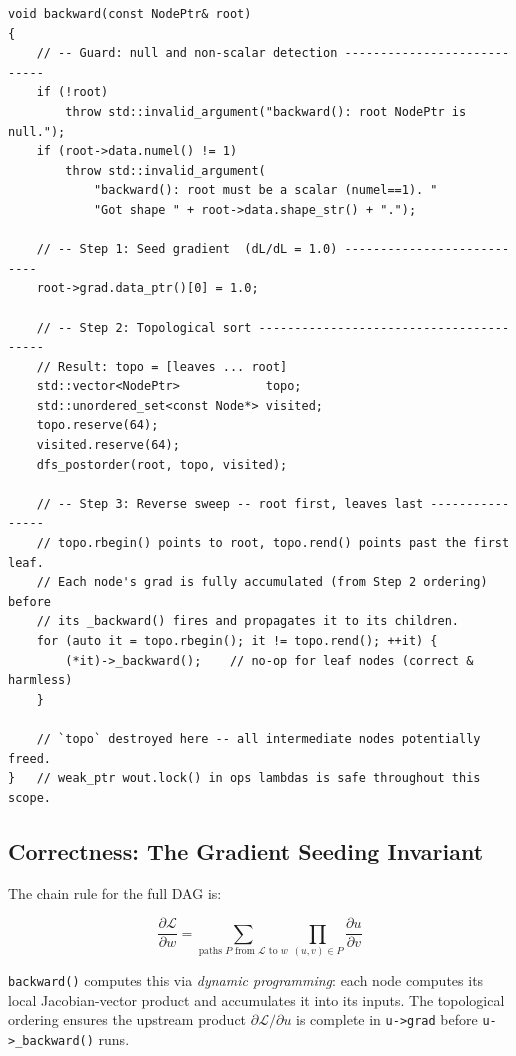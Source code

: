 \documentclass[12pt, a4paper]{article}
\begin{document}
\begin{lstlisting}[caption={\texttt{backward()} - the complete implementation}]
void backward(const NodePtr& root)
{
    // -- Guard: null and non-scalar detection ----------------------------
    if (!root)
        throw std::invalid_argument("backward(): root NodePtr is null.");
    if (root->data.numel() != 1)
        throw std::invalid_argument(
            "backward(): root must be a scalar (numel==1). "
            "Got shape " + root->data.shape_str() + ".");

    // -- Step 1: Seed gradient  (dL/dL = 1.0) ---------------------------
    root->grad.data_ptr()[0] = 1.0;

    // -- Step 2: Topological sort ----------------------------------------
    // Result: topo = [leaves ... root]
    std::vector<NodePtr>            topo;
    std::unordered_set<const Node*> visited;
    topo.reserve(64);
    visited.reserve(64);
    dfs_postorder(root, topo, visited);

    // -- Step 3: Reverse sweep -- root first, leaves last ----------------
    // topo.rbegin() points to root, topo.rend() points past the first leaf.
    // Each node's grad is fully accumulated (from Step 2 ordering) before
    // its _backward() fires and propagates it to its children.
    for (auto it = topo.rbegin(); it != topo.rend(); ++it) {
        (*it)->_backward();    // no-op for leaf nodes (correct & harmless)
    }

    // `topo` destroyed here -- all intermediate nodes potentially freed.
}   // weak_ptr wout.lock() in ops lambdas is safe throughout this scope.
\end{lstlisting}

\subsection{Correctness: The Gradient Seeding Invariant}

The chain rule for the full DAG is:

\[
  \frac{\partial \mathcal{L}}{\partial w}
  = \sum_{\text{paths } P \text{ from } \mathcal{L} \text{ to } w}
    \prod_{(u,v) \in P} \frac{\partial u}{\partial v}
\]

\texttt{backward()} computes this via \emph{dynamic programming}:
each node computes its local Jacobian-vector product and accumulates it
into its inputs.  The topological ordering ensures the upstream product
\(\partial \mathcal{L}/\partial u\) is complete in \texttt{u->grad}
before \texttt{u->\_backward()} runs.
\end{document}
